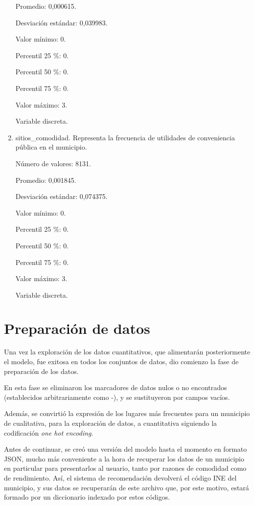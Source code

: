\begin{enumerate}
	Promedio: 0,000615.
	
	Desviación estándar: 0,039983.
	
	Valor mínimo: 0.
	
	Percentil 25 \%: 0.
	
	Percentil 50 \%: 0.
	
	Percentil 75 \%: 0.
	
	Valor máximo: 3.
	
	Variable discreta.

	\item sitios\_comodidad. Representa la frecuencia de utilidades de conveniencia pública en el municipio.
	
	Número de valores: 8131.
	
	Promedio: 0,001845.
	
	Desviación estándar: 0,074375.
	
	Valor mínimo: 0.
	
	Percentil 25 \%: 0.
	
	Percentil 50 \%: 0.
	
	Percentil 75 \%: 0.
	
	Valor máximo: 3.
	
	Variable discreta.
\end{enumerate}

\section{Preparación de datos}

Una vez la exploración de los datos cuantitativos, que alimentarán posteriormente el modelo, fue exitosa en todos los conjuntos de datos, dio comienzo la fase de preparación de los datos.

En esta fase se eliminaron los marcadores de datos nulos o no encontrados (establecidos arbitrariamente como \guillemotleft -\guillemotright\space), y se sustituyeron por campos vacíos.


Además, se convirtió la expresión de los lugares más frecuentes para un municipio de cualitativa, para la exploración de datos, a cuantitativa siguiendo la codificación \textit{one hot encoding}.


Antes de continuar, se creó una versión del modelo hasta el momento en formato JSON, mucho más conveniente a la hora de recuperar los datos de un municipio en particular para presentarlos al usuario, tanto por razones de comodidad como de rendimiento. Así, el sistema de recomendación devolverá el código INE del municipio, y sus datos se recuperarán de este archivo que, por este motivo, estará formado por un diccionario indexado por estos códigos.

